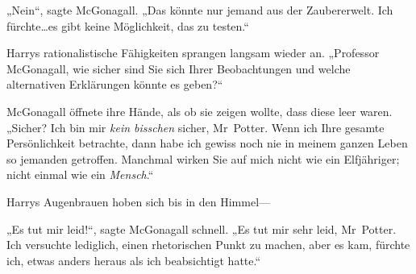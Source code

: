 „Nein“, sagte McGonagall. „Das könnte nur jemand aus der Zaubererwelt. Ich fürchte…es gibt keine Möglichkeit, das zu testen.“

Harrys rationalistische Fähigkeiten sprangen langsam wieder an. „Professor McGonagall, wie sicher sind Sie sich Ihrer Beobachtungen und welche alternativen Erklärungen könnte es geben?“

McGonagall öffnete ihre Hände, als ob sie zeigen wollte, dass diese leer waren. „Sicher? Ich bin mir \emph{kein bisschen} sicher, Mr~Potter. Wenn ich Ihre gesamte Persönlichkeit betrachte, dann habe ich gewiss noch nie in meinem ganzen Leben so jemanden getroffen. Manchmal wirken Sie auf mich nicht wie ein Elfjähriger; nicht einmal wie ein \emph{Mensch}.“

Harrys Augenbrauen hoben sich bis in den Himmel—

„Es tut mir leid!“, sagte McGonagall schnell. „Es tut mir sehr leid, Mr~Potter. Ich versuchte lediglich, einen rhetorischen Punkt zu machen, aber es kam, fürchte ich, etwas anders heraus als ich beabsichtigt hatte.“

